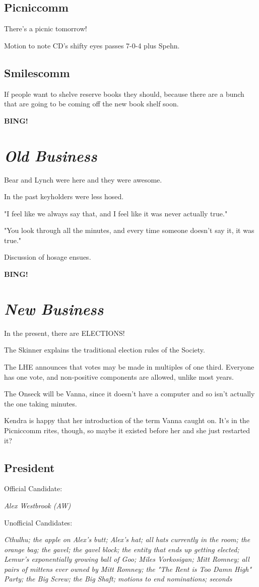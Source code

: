 \documentclass[10pt]{article}
\newcommand{\bing}{{\bf BING!} }
\newcommand{\goto}[1]{\bing \vskip 12pt \section*{{\em{#1}}}}
\newcommand{\ps}{ plus Spehn\xspace}
\begin{document}
\subsection*{Picniccomm}

There's a picnic tomorrow!

Motion to note CD's shifty eyes passes 7-0-4\ps.

\subsection*{Smilescomm}

If people want to shelve reserve books they should, because there are a bunch that
are going to be coming off the new book shelf soon.

\goto{Old Business}

Bear and Lynch were here and they were awesome.

In the past keyholders were less hosed.

"I feel like we always say that, and I feel like it was never actually true."

"You look through all the minutes, and every time someone doesn't say it, it was true."

Discussion of hosage ensues.


\goto{New Business}

In the present, there are ELECTIONS!

The Skinner explains the traditional election rules of the Society.

The LHE announces that votes may be made in multiples of one third.  Everyone
has one vote, and non-positive components are allowed, unlike most years.

The Onseck will be Vanna, since it doesn't have a computer and so isn't actually
the one taking minutes.

Kendra is happy that her introduction of the term Vanna caught on.  It's in the
Picniccomm rites, though, so maybe it existed before her and she just restarted it?

\subsection*{President}

Official Candidate:

\emph{Alex Westbrook (AW)}

Unofficial Candidates: 

\emph{Cthulhu; the apple on Alex's butt; Alex's hat; all hats currently in the room; the orange bag; the gavel; the gavel block; the entity that ends up getting elected; Lemur's exponentially growing ball of Goo; Miles Vorkosigan; Mitt Romney; all pairs of mittens ever owned by Mitt Romney; the "The Rent is Too Damn High" Party; the Big Screw; the Big Shaft; motions to end nominations; seconds}
\end{document}
